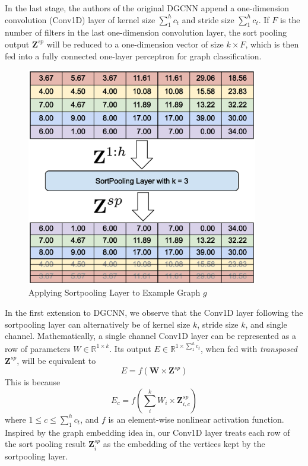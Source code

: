  In the last stage,
the authors of the original DGCNN\cite{Dgcnn} append a one-dimension convolution (Conv1D) layer of kernel size $\sum_{1}^{h}c_t$ and stride size $\sum_{1}^{h}c_t$.
If $F$ is the number of filters in the last one-dimension convolution layer,
the sort pooling output $\mathbf{Z}^{sp}$ will be reduced to a one-dimension vector of size $k \times F$,
which is then fed into a fully connected one-layer perceptron for graph classification.

\begin{figure}[htbp]
    \centerline{\includegraphics[width=0.90\textwidth]{Magic/figures/ExampleSortpool.eps}}
    \caption{Applying Sortpooling Layer to Example Graph $g$}
    \label{MG:Fig:ExampleSortpool}
\end{figure}

In the first extension to DGCNN, we observe that the Conv1D layer following the sortpooling layer can alternatively be of kernel size $k$, stride size $k$, and single channel.
Mathematically, a single channel Conv1D layer can be represented as a row of parameters $W \in \mathbb{R}^{1 \times k}$.
Its output $E \in \mathbb{R}^{1 \times \sum_{1}^{h}c_t}$, when fed with \textit{transposed} $\mathbf{Z}^{sp}$, will be equivalent to
\begin{equation}
    E = f(\mathbf{W} \times \mathbf{Z}^{sp})
    \label{MG:Equ:WeightedVertices}
\end{equation}
This is because
\begin{equation}
    E_c = f(\sum_{i}^{k} W_i \times \mathbf{Z}^{sp}_{i, c})
\end{equation}
where $1\leq c \leq \sum_{1}^{h}c_t$, and $f$ is an element-wise nonlinear activation function.
Inspired by the graph embedding idea in\cite{GraphEmbedding}, our Conv1D layer treats each row of the sort pooling result $\mathbf{Z}^{sp}_{i}$ as the embedding of the vertices kept by the sortpooling layer.

